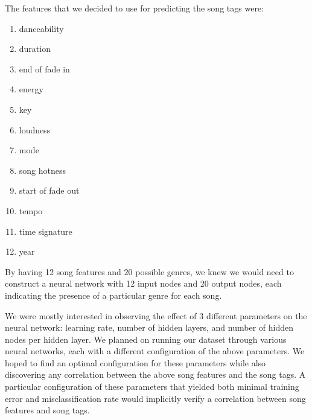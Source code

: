 \documentclass[12pt]{article}
\begin{document}
The features that we decided to use for predicting the song tags were: 
\begin{enumerate}
    \item danceability
    \vspace{-3.5mm}
    \item duration
    \vspace{-3.5mm}
    \item end of fade in
    \vspace{-3.5mm}
    \item energy
    \vspace{-3.5mm}
    \item key
    \vspace{-3.5mm}
    \item loudness
    \vspace{-3.5mm}
    \item mode
    \vspace{-3.5mm}
    \item song hotness
    \vspace{-3.5mm}
    \item start of fade out
    \vspace{-3.5mm} 
    \item tempo
    \vspace{-3.5mm}
    \item time signature
    \vspace{-3.5mm}
    \item year
\end{enumerate}

By having 12 song features and 20 possible genres, we knew we would need to construct a neural network with 12 input nodes and 20 output nodes, each indicating the presence of a particular genre for each song. 

We were mostly interested in observing the effect of 3 different parameters on the neural network: learning rate, number of hidden layers, and number of hidden nodes per hidden layer. We planned on running our dataset through various neural networks, each with a different configuration of the above parameters. We hoped to find an optimal configuration for these parameters while also discovering any correlation between the above song features and the song tags. A particular configuration of these parameters that yielded both minimal training error and misclassification rate would implicitly verify a correlation between song features and song tags.

\end{document}
